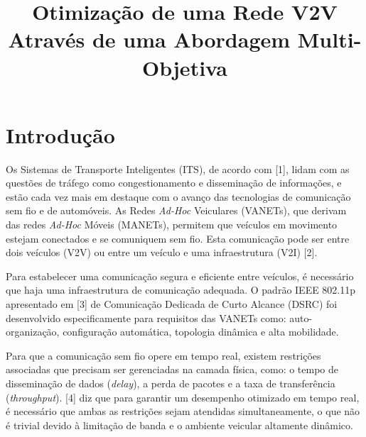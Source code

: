 \documentclass[conference]{IEEEtran}
\begin{document}
\title{Otimização de uma Rede V2V Através de uma Abordagem Multi-Objetiva}

\author{
\and
{}
}

\maketitle

\begin{abstract}

\end{abstract}

\section{Introdução}

Os Sistemas de Transporte Inteligentes (ITS), de acordo com [1], lidam com as questões de tráfego como congestionamento e disseminação de informações, e estão cada vez mais em destaque com o avanço das tecnologias de comunicação sem fio e de automóveis. As Redes \textit{Ad-Hoc} Veiculares (VANETs), que derivam das redes \textit{Ad-Hoc} Móveis (MANETs), permitem que veículos em movimento estejam conectados e se comuniquem sem fio. Esta comunicação pode ser entre dois veículos (V2V) ou entre um veículo e uma infraestrutura (V2I) [2].

Para estabelecer uma comunicação segura e eficiente entre veículos, é necessário que haja uma infraestrutura de comunicação adequada. O padrão IEEE 802.11p apresentado em [3] de Comunicação Dedicada de Curto Alcance (DSRC) foi desenvolvido especificamente para requisitos das VANETs como: auto-organização, configuração automática, topologia dinâmica e alta mobilidade.

Para que a comunicação sem fio opere em tempo real, existem restrições associadas que precisam ser gerenciadas na camada física, como: o tempo de disseminação de dados (\textit{delay}), a perda de pacotes e a taxa de transferência (\textit{throughput}). [4] diz que para garantir um desempenho otimizado em tempo real, é necessário que ambas as restrições sejam atendidas simultaneamente, o que não é trivial devido à limitação de banda e o ambiente veicular altamente dinâmico.
\end{document}

